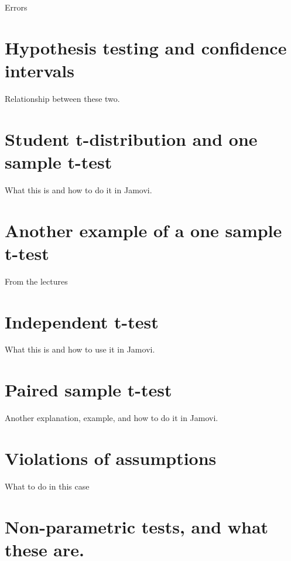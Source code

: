 \documentclass[
]{scrbook}
\begin{document}
Errors

\hypertarget{hypothesis-testing-and-confidence-intervals}{%
\chapter{Hypothesis testing and confidence intervals}\label{hypothesis-testing-and-confidence-intervals}}

Relationship between these two.

\hypertarget{student-t-distribution-and-one-sample-t-test}{%
\chapter{Student t-distribution and one sample t-test}\label{student-t-distribution-and-one-sample-t-test}}

What this is and how to do it in Jamovi.

\hypertarget{another-example-of-a-one-sample-t-test}{%
\chapter{Another example of a one sample t-test}\label{another-example-of-a-one-sample-t-test}}

From the lectures

\hypertarget{independent-t-test}{%
\chapter{Independent t-test}\label{independent-t-test}}

What this is and how to use it in Jamovi.

\hypertarget{paired-sample-t-test}{%
\chapter{Paired sample t-test}\label{paired-sample-t-test}}

Another explanation, example, and how to do it in Jamovi.

\hypertarget{violations-of-assumptions}{%
\chapter{Violations of assumptions}\label{violations-of-assumptions}}

What to do in this case

\hypertarget{non-parametric-tests-and-what-these-are.}{%
\chapter{Non-parametric tests, and what these are.}\label{non-parametric-tests-and-what-these-are.}}
\end{document}
